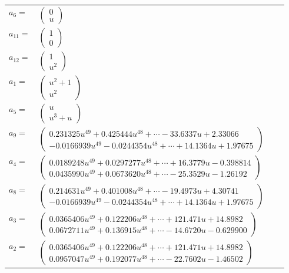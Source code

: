 \documentclass[1p]{elsarticle_modified}
\theoremstyle{definition}
\begin{document}
\begin{tabular}{m{7pt} m{180pt} m{7pt} m{180pt} }
\flushright $a_{6}=$&$\begin{pmatrix}0\\u\end{pmatrix}$ \\
\flushright $a_{11}=$&$\begin{pmatrix}1\\0\end{pmatrix}$ \\
\flushright $a_{12}=$&$\begin{pmatrix}1\\u^2\end{pmatrix}$ \\
\flushright $a_{1}=$&$\begin{pmatrix}u^2+1\\u^2\end{pmatrix}$ \\
\flushright $a_{5}=$&$\begin{pmatrix}u\\u^3+u\end{pmatrix}$ \\
\flushright $a_{9}=$&$\begin{pmatrix}0.231325 u^{49}+0.425444 u^{48}+\cdots-33.6337 u+2.33066\\-0.0166939 u^{49}-0.0244354 u^{48}+\cdots+14.1364 u+1.97675\end{pmatrix}$ \\
\flushright $a_{4}=$&$\begin{pmatrix}0.0189248 u^{49}+0.0297277 u^{48}+\cdots+16.3779 u-0.398814\\0.0435990 u^{49}+0.0673620 u^{48}+\cdots-25.3529 u-1.26192\end{pmatrix}$ \\
\flushright $a_{8}=$&$\begin{pmatrix}0.214631 u^{49}+0.401008 u^{48}+\cdots-19.4973 u+4.30741\\-0.0166939 u^{49}-0.0244354 u^{48}+\cdots+14.1364 u+1.97675\end{pmatrix}$ \\
\flushright $a_{3}=$&$\begin{pmatrix}0.0365406 u^{49}+0.122206 u^{48}+\cdots+121.471 u+14.8982\\0.0672711 u^{49}+0.136915 u^{48}+\cdots-14.6720 u-0.629900\end{pmatrix}$ \\
\flushright $a_{2}=$&$\begin{pmatrix}0.0365406 u^{49}+0.122206 u^{48}+\cdots+121.471 u+14.8982\\0.0957047 u^{49}+0.192077 u^{48}+\cdots-22.7602 u-1.46502\end{pmatrix}$ \\

\end{tabular}
\end{document}
